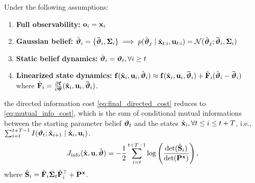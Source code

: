 \begin{theorem}
\label{thm:mi_special_case}
Under the following assumptions:
\begin{enumerate}
    \item \textbf{Full observability:} $\mathbf{o}_{i} = \mathbf{x}_{i}$
    \item \textbf{Gaussian belief:} $\hat{\boldsymbol{{\vartheta}}}_{i}  = \{\boldsymbol{\bar{\boldsymbol{{\vartheta}}}}_i, \boldsymbol{\boldsymbol{\Sigma}}_i\} \implies p(\hat{\boldsymbol{{\vartheta}}}_{j} \mid \hat{\mathbf{x}}_{t:i}, \mathbf{u}_{t:i}) = \mathcal{N}(\hat{\boldsymbol{{\vartheta}}}_{j}; \boldsymbol{\bar{\boldsymbol{{\vartheta}}}}_i, \boldsymbol{\boldsymbol{\Sigma}}_i )$
    \item \textbf{Static belief dynamics:} $\hat{\boldsymbol{{\vartheta}}}_{i} = \boldsymbol{{\vartheta}}_t, \forall i \ge t$
    \item \textbf{Linearized state dynamics:} $\mathbf{f}(\hat{\mathbf{x}}_i, \mathbf{u}_i, \hat{\boldsymbol{{\vartheta}}}_{i}) \approx \mathbf{f}(\hat{\mathbf{x}}_i, \mathbf{u}_i, \boldsymbol{\bar{\boldsymbol{{\vartheta}}}}_i) + \hat{\mathbf{F}}_i (\hat{\boldsymbol{{\vartheta}}}_{i} - \boldsymbol{\bar{\boldsymbol{{\vartheta}}}}_i)$ where $\hat{\mathbf{F}}_i = \frac{\partial \mathbf{f}}{\partial \boldsymbol{\theta}}(\hat{\mathbf{x}}_i, \mathbf{u}_i, \boldsymbol{\bar{\boldsymbol{{\vartheta}}}}_i)$.
\end{enumerate}
the directed information cost \eqref{eq:final_directed_cost} reduces to \cref{eq:mutual_info_cost}, which is the sum of conditional mutual informations between the starting parameter belief $\boldsymbol{{\vartheta}}_t$ and the states $\hat{\mathbf{x}}_{i}, \forall t \leq i \leq t + T$, i.e., $\sum_{i = t}^{t + T - 1}I(\boldsymbol{{\vartheta}}_t; \hat{\mathbf{x}}_{i+1} \mid \hat{\mathbf{x}}_{i}, \mathbf{u}_{i})$. 
\begin{equation}
    J_{\text{info}}(\hat{\mathbf{x}}, \mathbf{u}, \hat{\boldsymbol{{\vartheta}}}) = - \frac{1}{2} \sum_{i=t}^{t+T-1} \log \left(\frac{\det (\hat{\mathbf{S}}_i)}{\det (\mathbf{P}^{\mathbf{x}})}\right),
    \label{eq:mutual_info_cost}
\end{equation}
where $\hat{\mathbf{S}}_i = \hat{\mathbf{F}}_i \boldsymbol{\boldsymbol{\Sigma}}_t \hat{\mathbf{F}}_i^\top + \mathbf{P}^{\mathbf{x}}$.
\end{theorem}

